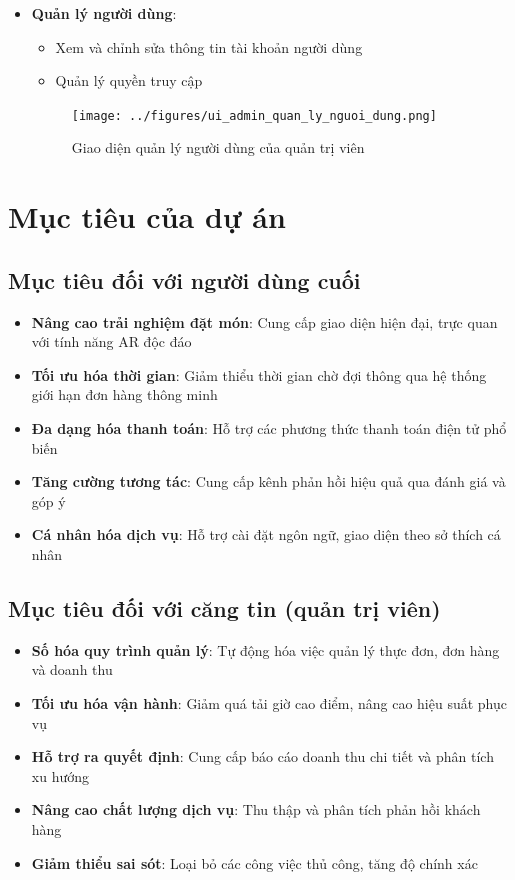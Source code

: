 \documentclass[12pt,a4paper]{article}
\begin{document}
\begin{itemize}[leftmargin=1cm]
    \item \textbf{Quản lý người dùng}:
        \begin{itemize}[leftmargin=0.5cm]
            \item Xem và chỉnh sửa thông tin tài khoản người dùng
            \item Quản lý quyền truy cập
        \end{itemize}
\begin{figure}[H]
    \centering
    \texttt{[image: ../figures/ui\_admin\_quan\_ly\_nguoi\_dung.png]} %
    \caption{Giao diện quản lý người dùng của quản trị viên}
    \label{fig:ui_admin_users}
\end{figure}
\end{itemize}

\section{Mục tiêu của dự án}

\subsection{Mục tiêu đối với người dùng cuối}
\begin{itemize}[leftmargin=1cm]
    \item \textbf{Nâng cao trải nghiệm đặt món}: Cung cấp giao diện hiện đại, trực quan với tính năng AR độc đáo
    \item \textbf{Tối ưu hóa thời gian}: Giảm thiểu thời gian chờ đợi thông qua hệ thống giới hạn đơn hàng thông minh
    \item \textbf{Đa dạng hóa thanh toán}: Hỗ trợ các phương thức thanh toán điện tử phổ biến
    \item \textbf{Tăng cường tương tác}: Cung cấp kênh phản hồi hiệu quả qua đánh giá và góp ý
    \item \textbf{Cá nhân hóa dịch vụ}: Hỗ trợ cài đặt ngôn ngữ, giao diện theo sở thích cá nhân
\end{itemize}

\subsection{Mục tiêu đối với căng tin (quản trị viên)}
\begin{itemize}[leftmargin=1cm]
    \item \textbf{Số hóa quy trình quản lý}: Tự động hóa việc quản lý thực đơn, đơn hàng và doanh thu
    \item \textbf{Tối ưu hóa vận hành}: Giảm quá tải giờ cao điểm, nâng cao hiệu suất phục vụ
    \item \textbf{Hỗ trợ ra quyết định}: Cung cấp báo cáo doanh thu chi tiết và phân tích xu hướng
    \item \textbf{Nâng cao chất lượng dịch vụ}: Thu thập và phân tích phản hồi khách hàng
    \item \textbf{Giảm thiểu sai sót}: Loại bỏ các công việc thủ công, tăng độ chính xác
\end{itemize}
\end{document}
